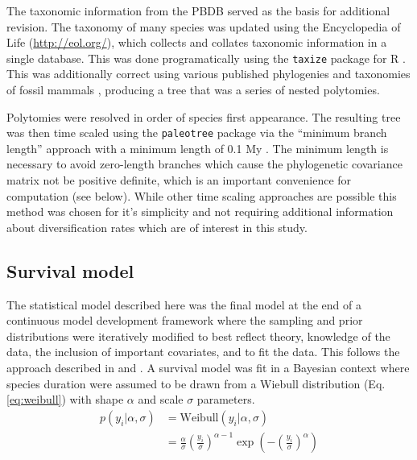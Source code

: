 \documentclass[12pt,letterpaper]{article}
\begin{document}
The taxonomic information from the PBDB served as the basis for additional revision. The taxonomy of many species was updated using the Encyclopedia of Life (\url{http://eol.org/}), which collects and collates taxonomic information in a single database. This was done programatically using the \texttt{taxize} package for R \citep{2013taxize}. This was additionally correct using various published phylogenies and taxonomies of fossil mammals \citep{Raia2012f,Janis1998,Janis2008}, producing a tree that was a series of nested polytomies. 

Polytomies were resolved in order of species first appearance. The resulting tree was then time scaled using the \texttt{paleotree} package via the ``minimum branch length'' approach with a minimum length of 0.1 My \citep{Bapst2012a}. The minimum length is necessary to avoid zero-length branches which cause the phylogenetic covariance matrix not be positive definite, which is an important convenience for computation (see below). While other time scaling approaches are possible \citep{Bapst2013a,Hedman2010} this method was chosen for it's simplicity and not requiring additional information about diversification rates which are of interest in this study. 



\subsection{Survival model}

The statistical model described here was the final model at the end of a continuous model development framework where the sampling and prior distributions were iteratively modified to best reflect theory, knowledge of the data, the inclusion of important covariates, and to fit the data. This follows the approach described in \citet{Gelman2007} and \citet{Gelman2013d}.
A survival model was fit in a Bayesian context where species duration were assumed to be drawn from a Wiebull distribution (Eq. \ref{eq:weibull}) with shape \(\alpha\) and scale \(\sigma\) parameters. 
\begin{align}
  p(y_{i}|\alpha, \sigma) &= \mathrm{Weibull}(y_{i}|\alpha, \sigma) \nonumber \\ 
  &= \frac{\alpha}{\sigma} \left(\frac{y_{i}}{\sigma}\right)^{\alpha - 1} \exp\left(-\left(\frac{y_{i}}{\sigma}\right)^{\alpha}\right) 
  \label{eq:weibull}
\end{align}
\end{document}
